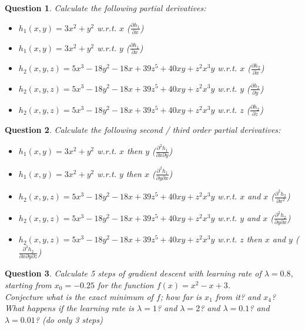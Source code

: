 \documentclass[]{article}
\newtheorem{question}{Question}
\begin{document}
	\begin{question}
		Calculate the following partial derivatives:\\
		\begin{itemize}
			\item $h_1(x,y) = 3x^2+y^2$ w.r.t. $x$ ($\frac{\partial h_1}{\partial x}$)
			\item $h_1(x,y) = 3x^2+y^2$ w.r.t. $y$ ($\frac{\partial h_1}{\partial x}$)
			\item $h_2(x,y,z) = 5x^3-18y^2-18x+39z^5+40xy+z^2x^3y$ w.r.t. $x$ ($\frac{\partial h_2}{\partial x}$)
			\item $h_2(x,y,z) = 5x^3-18y^2-18x+39z^5+40xy+z^2x^3y$ w.r.t. $y$ ($\frac{\partial h_2}{\partial y}$)
			\item $h_2(x,y,z) = 5x^3-18y^2-18x+39z^5+40xy+z^2x^3y$ w.r.t. $z$ ($\frac{\partial h_2}{\partial z}$)
		\end{itemize}
	\end{question}
	
	\begin{question}
		Calculate the following second / third order partial derivatives:\\
		\begin{itemize}
			\item $h_1(x,y) = 3x^2+y^2$ w.r.t. $x$ then $y$ ($\frac{\partial^2 h_1}{\partial x \partial y}$)
			\item $h_1(x,y) = 3x^2+y^2$ w.r.t. $y$ then $x$ ($\frac{\partial^2 h_1}{\partial y \partial x}$)
			\item $h_2(x,y,z) = 5x^3-18y^2-18x+39z^5+40xy+z^2x^3y$ w.r.t. $x$ and $x$ ($\frac{\partial^2 h_2}{\partial x^2}$)
			\item $h_2(x,y,z) = 5x^3-18y^2-18x+39z^5+40xy+z^2x^3y$ w.r.t. $y$ and $x$ ($\frac{\partial^2 h_2}{\partial y \partial x}$)
			\item $h_2(x,y,z) = 5x^3-18y^2-18x+39z^5+40xy+z^2x^3y$ w.r.t. $z$ then $x$ and $y$ ($\frac{\partial^3 h_2}{\partial x \partial y \partial z}$)
		\end{itemize}
	\end{question}
	
	\begin{question}
		Calculate 5 steps of gradient descent with learning rate of $\lambda = 0.8$, starting from $x_0 = -0.25$ for the function $f(x) = x^2-x+3$.\\
		Conjecture what is the exact minimum of $f$; how far is $x_1$ from it? and $x_4$?\\
		What happens if the learning rate is $\lambda = 1$? and $\lambda = 2$? and $\lambda = 0.1$? and $\lambda = 0.01$? (do only 3 steps)
	\end{question}
	
	
\end{document}

